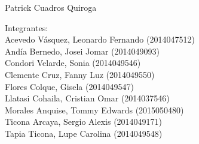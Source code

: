 \documentclass[12pt,letterpaper]{article}
\begin{document}
\begin{titlepage}
\begin{center}
\vspace*{0.1in}
\begin{large}
 Patrick Cuadros Quiroga\\
\end{large}

\vspace*{0.2in}
\vspace*{0.1in}
\begin{large}
\begin{flushleft}
Integrantes: \\
Acevedo Vásquez, Leonardo Fernando 	(2014047512) \\
Andía Bernedo, Josei Jomar 			(2014049093) \\
Condori Velarde, Sonia          	(2014049546) \\
Clemente Cruz, Fanny Luz    		(2014049550) \\
Flores Colque, Gisela           	(2014049547) \\
Llatasi Cohaila, Cristian Omar		(2014037546) \\
Morales Anquise, Tommy Edwards 		(2015050480) \\
Ticona Arcaya, Sergio Alexis		(2014049171) \\
Tapia Ticona, Lupe Carolina			(2014049548) \\
\end{flushleft}


\end{large}
\end{center}

\end{titlepage}




\tableofcontents
\thispagestyle{empty}
\newpage
\setcounter{page}{1}

 
\end{document}
